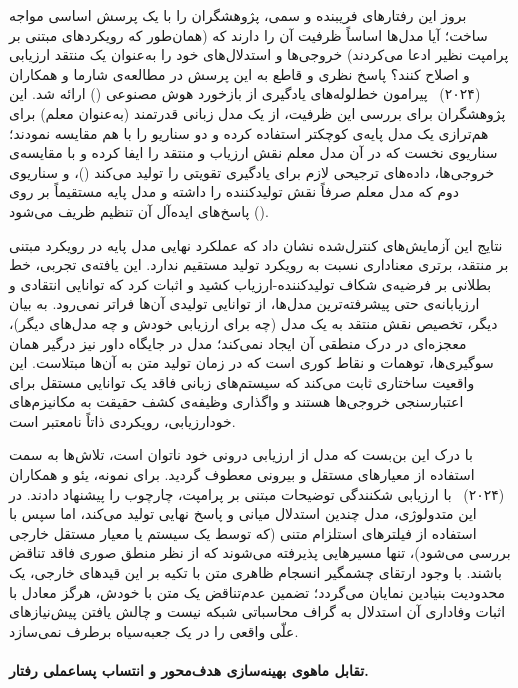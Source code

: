 بروز این رفتارهای فریبنده و سمی، پژوهشگران را با یک پرسش اساسی مواجه ساخت؛ آیا مدل‌ها اساساً ظرفیت آن را دارند که (همان‌طور که رویکردهای مبتنی بر پرامپت نظیر  ادعا می‌کردند) خروجی‌ها و استدلال‌های خود را به‌عنوان یک منتقد ارزیابی و اصلاح کنند؟ پاسخ نظری و قاطع به این پرسش در مطالعه‌ی شارما و همکاران (۲۰۲۴)~\cite{sharma2024acritical} پیرامون خط‌لوله‌های یادگیری از بازخورد هوش مصنوعی () ارائه شد. این پژوهشگران برای بررسی این ظرفیت، از یک مدل زبانی قدرتمند (به‌عنوان معلم) برای هم‌ترازی یک مدل پایه‌ی کوچکتر استفاده کرده و دو سناریو را با هم مقایسه نمودند؛ سناریوی نخست که در آن مدل معلم نقش ارزیاب و منتقد را ایفا کرده و با مقایسه‌ی خروجی‌ها، داده‌های ترجیحی لازم برای یادگیری تقویتی را تولید می‌کند ()، و سناریوی دوم که مدل معلم صرفاً نقش تولیدکننده را داشته و مدل پایه مستقیماً بر روی پاسخ‌های ایده‌آل آن تنظیم ظریف می‌شود (). 

نتایج این آزمایش‌های کنترل‌شده نشان داد که عملکرد نهایی مدل پایه در رویکرد مبتنی بر منتقد، برتری معناداری نسبت به رویکرد تولید مستقیم ندارد. این یافته‌ی تجربی، خط بطلانی بر فرضیه‌ی شکاف تولیدکننده-ارزیاب کشید و اثبات کرد که توانایی انتقادی و ارزیابانه‌ی حتی پیشرفته‌ترین مدل‌ها، از توانایی تولیدی آن‌ها فراتر نمی‌رود. به بیان دیگر، تخصیص نقش منتقد به یک مدل (چه برای ارزیابی خودش و چه مدل‌های دیگر)، معجزه‌ای در درک منطقی آن ایجاد نمی‌کند؛ مدل در جایگاه داور نیز درگیر همان سوگیری‌ها، توهمات و نقاط کوری است که در زمان تولید متن به آن‌ها مبتلاست. این واقعیت ساختاری ثابت می‌کند که سیستم‌های زبانی فاقد یک توانایی مستقل برای اعتبارسنجی خروجی‌ها هستند و واگذاری وظیفه‌ی کشف حقیقت به مکانیزم‌های خودارزیابی، رویکردی ذاتاً نامعتبر است.

با درک این بن‌بست که مدل از ارزیابی درونی خود ناتوان است، تلاش‌ها به سمت استفاده از معیارهای مستقل و بیرونی معطوف گردید. برای نمونه، یئو و همکاران (۲۰۲۴)~\cite{weijie2024howinterpretable} با ارزیابی شکنندگی توضیحات مبتنی بر پرامپت، چارچوب  را پیشنهاد دادند. در این متدولوژی، مدل چندین استدلال میانی و پاسخ نهایی تولید می‌کند، اما سپس با استفاده از فیلترهای استلزام متنی (که توسط یک سیستم یا معیار مستقل خارجی بررسی می‌شود)، تنها مسیرهایی پذیرفته می‌شوند که از نظر منطق صوری فاقد تناقض باشند. با وجود ارتقای چشمگیر انسجام ظاهری متن با تکیه بر این قیدهای خارجی، یک محدودیت بنیادین نمایان می‌گردد؛ تضمین عدم‌تناقض یک متن با خودش، هرگز معادل با اثبات وفاداری آن استدلال به گراف محاسباتی شبکه نیست و چالش یافتن پیش‌نیازهای علّی واقعی را در یک جعبه‌سیاه برطرف نمی‌سازد.

\paragraph{تقابل ماهوی بهینه‌سازی هدف‌محور و انتساب پساعملی رفتار.}

